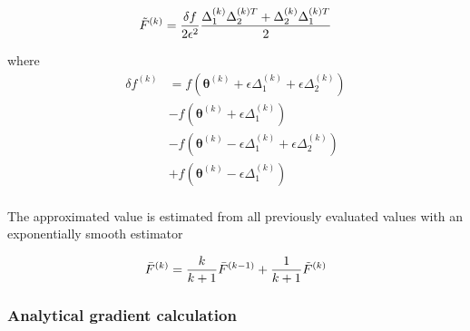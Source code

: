 \begin{equation}
    \Tilde{F}^{(k)} = \frac{\delta f}{2\epsilon^2}\frac{\Delta^{(k)}_1\Delta^{(k)T}_2+\Delta^{(k)}_2\Delta^{(k)T}_1}{2}
\end{equation}

where 
\begin{align}
    \delta f^{(k)} &= f(\boldsymbol{\theta}^{(k)}+\epsilon\Delta_1^{(k)} +\epsilon\Delta_2^{(k)}) \\ 
    &- f(\boldsymbol{\theta}^{(k)}+\epsilon\Delta_1^{(k)}) \\
    &- f(\boldsymbol{\theta}^{(k)}-\epsilon \Delta_1^{(k)} + \epsilon \Delta_2^{(k)}) \\ 
    &+ f(\boldsymbol{\theta}^{(k)}-\epsilon \Delta_1^{(k)}) \\ 
\end{align}

The approximated value is estimated from all previously evaluated values with an exponentially smooth estimator 
 
 \begin{equation}
 \bar{F}^{(k)} = \frac{k}{k+1} \bar{F}^{(k-1)} + \frac{1}{k+1} \Tilde{F}^{(k)}
 \end{equation}


\subsubsection{Analytical gradient calculation}

